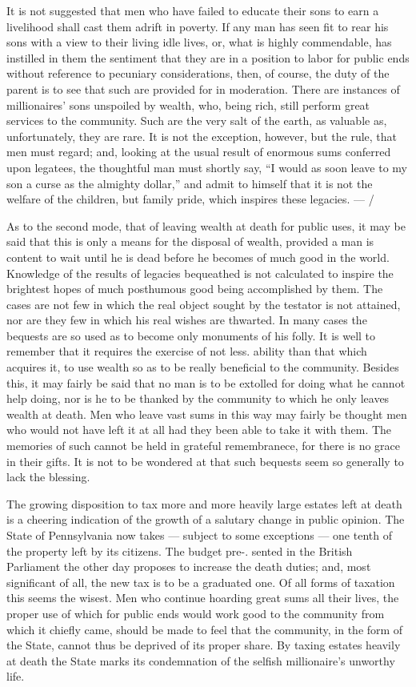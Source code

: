 \documentclass[11pt,openany]{book}
\begin{document}
It is not suggested that men who have failed to educate their sons to earn a livelihood shall cast them adrift in poverty. If any man has seen fit to rear his sons with a view to their living idle lives, or, what is highly commendable, has instilled in them the sentiment that they are in a position to labor for public ends without reference to pecuniary considerations, then, of course, the duty of the parent is to see that such are provided for in moderation. There are instances of millionaires' sons unspoiled by wealth, who, being rich, still perform great services to the community. Such are the very salt of the earth, as valuable as, unfortunately, they are rare. It is not the exception, however, but the rule, that men must regard; and, looking at the usual result of enormous sums conferred upon legatees, the thoughtful man must shortly say, ``I would as soon leave to my son a curse as the almighty dollar,'' and admit to himself that it is not the welfare of the children, but family pride, which inspires these legacies. --- /

As to the second mode, that of leaving wealth at death for public uses, it may be said that this is only a means for the disposal of wealth, provided a man is content to wait until he is dead before he becomes of much good in the world. Knowledge of the results of legacies bequeathed is not calculated to inspire the brightest hopes of much posthumous good being accomplished by them. The cases are not few in which the real object sought by the testator is not attained, nor are they few in which his real wishes are thwarted. In many cases the bequests are so used as to become only monuments of his folly. It is well to remember that it requires the exercise of not less. ability than that which acquires it, to use wealth so as to be really beneficial to the community. Besides this, it may fairly be said that no man is to be extolled for doing what he cannot help doing, nor is he to be thanked by the community to which he only leaves wealth at death. Men who leave vast sums in this way may fairly be thought men who would not have left it at all had they been able to take it with them. The memories of such cannot be held in grateful remembranece, for there is no grace in their gifts. It is not to be wondered at that such bequests seem so generally to lack the blessing.

The growing disposition to tax more and more heavily large estates left at death is a cheering indication of the growth of a salutary change in public opinion. The State of Pennsylvania now takes --- subject to some exceptions --- one tenth of the property left by its citizens. The budget pre-. sented in the British Parliament the other day proposes to increase the death duties; and, most significant of all, the new tax is to be a graduated one. Of all forms of taxation this seems the wisest. Men who continue hoarding great sums all their lives, the proper use of which for public ends would work good to the community from which it chiefly came, should be made to feel that the community, in the form of the State, cannot thus be deprived of its proper share. By taxing estates heavily at death the State marks its condemnation of the selfish millionaire's unworthy life.
\end{document}
